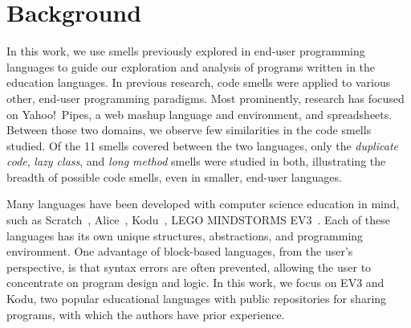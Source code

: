 \documentclass[conference]{IEEEtran}
\newcommand{\ms}{LEGO MINDSTORMS EV3}
\begin{document}
\section{Background}
\label{sec:background}
In this work, we use smells previously explored in end-user programming languages to guide our exploration and analysis of programs written in the education languages. 
In previous research, code smells were applied to various other, end-user programming paradigms. 
Most prominently, research has focused on Yahoo!\ Pipes, a web mashup language and environment, and spreadsheets. Between those two domains, we observe few similarities in the code smells studied. Of the 11 smells covered between the two languages, only the \emph{duplicate code}, \emph{lazy class}, and \emph{long method} smells  were studied in both, illustrating the breadth of  possible code smells, even in smaller, end-user languages.  

%
 


Many languages have been developed with computer science education in mind, such as Scratch~\cite{scratch}, Alice~\cite{aliceIntro}, Kodu~\cite{kodugrammar}, \ms~\cite{lego}. Each of these languages has its own unique structures, abstractions, and programming environment. One advantage of
block-based languages, from the user's perspective, is that syntax errors are often prevented, allowing the user to concentrate on program design and logic. In this work, we focus on EV3 and Kodu, two popular educational languages with public repositories for sharing programs, with which the authors have prior experience. 
\end{document}
